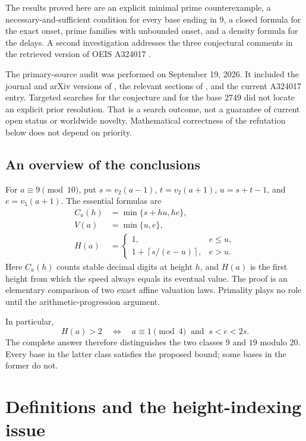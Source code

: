 \documentclass[11pt,letterpaper]{article}
\numberwithin{equation}{section}
\theoremstyle{definition}
\theoremstyle{remark}
\newcommand{\ceil}[1]{\left\lceil #1\right\rceil}
\begin{document}
The results proved here are an explicit minimal prime counterexample, a necessary-and-sufficient condition for every base ending in 9, a closed formula for the exact onset, prime families with unbounded onset, and a density formula for the delays. A second investigation addresses the three conjectural comments in the retrieved version of OEIS A324017 \cite{OEIS324017}.

The primary-source audit was performed on September 19, 2026. It included the journal and arXiv versions of \cite{Ripa2021}, the relevant sections of \cite{RipaOnnis2022}, and the current A324017 entry. Targeted searches for the conjecture and for the base $2749$ did not locate an explicit prior resolution. That is a search outcome, not a guarantee of current open status or worldwide novelty. Mathematical correctness of the refutation below does not depend on priority.

\subsection{An overview of the conclusions}

For $a\equiv9\pmod{10}$, put $s=v_2(a-1)$, $t=v_2(a+1)$, $u=s+t-1$, and $e=v_5(a+1)$. The essential formulas are
\begin{align}
 C_a(h)&=\min\{s+hu,he\},\label{eq:overview-count}\\
 V(a)&=\min\{u,e\},\label{eq:overview-speed}\\
 H(a)&=\begin{cases}
 1,&e\le u,\\
 1+\ceil{s/(e-u)},&e>u.
 \end{cases}\label{eq:overview-onset}
\end{align}
Here $C_a(h)$ counts stable decimal digits at height $h$, and $H(a)$ is the first height from which the speed always equals its eventual value. The proof is an elementary comparison of two exact affine valuation laws. Primality plays no role until the arithmetic-progression argument.

In particular,
\[
 H(a)>2\quad\Longleftrightarrow\quad
 a\equiv1\pmod4\ \text{ and }\ s<e<2s.
\]
The complete answer therefore distinguishes the two classes $9$ and $19$ modulo $20$. Every base in the latter class satisfies the proposed bound; some bases in the former do not.

\section{Definitions and the height-indexing issue}\label{sec:notation}
\end{document}
